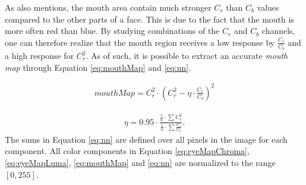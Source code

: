 
 As \cite{fdInColorImages} also mentions, the mouth area contain much stronger $C_{r}$ than $C_{b}$ values compared to the other parts of a face. This is due to the fact that the mouth is more often red than blue. By studying combinations of the $C_{r}$ and $C_{b}$ channels, one can therefore realize that the mouth region receives a low response by $\frac{C_{r}}{C_{b}}$ and a high response for $C_{r}^2$. As of such, it is possible to extract an accurate \textit{mouth map} through Equation \ref{eq:mouthMap} and \ref{eq:nn}.


\begin{equation} \label{eq:mouthMap}
\begin{split}
mouthMap = C_r^2 \cdot (C_r^2 - \eta \cdot \frac{C_r}{C_b})^2
\end{split}
\end{equation}

\begin{equation} \label{eq:nn}
\begin{split}
\eta = 0.95 \cdot \frac{\frac{1}{n} \cdot \sum\limits_{} C_r^2}{\frac{1}{n} \cdot \sum\limits_{} \frac{C_r}{C_b}}.
\end{split}
\end{equation}
The sums in Equation \ref{eq:nn} are defined over all pixels in the image for each component. 
\intendent All color components in Equation \ref{eq:eyeMapChroma}, \ref{eq:eyeMapLuma}, \ref{eq:mouthMap} and \ref{eq:nn} are normalized to the range $[0, 255]$.







